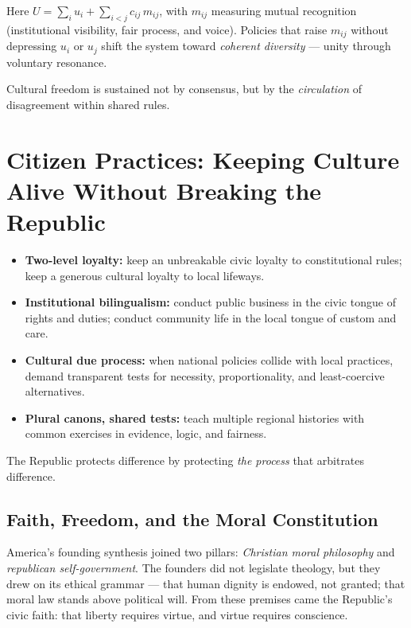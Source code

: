 \documentclass[12pt,twoside]{book}
\begin{document}
Here $U=\sum_i u_i + \sum_{i<j} c_{ij}\,m_{ij}$, with $m_{ij}$ measuring mutual recognition (institutional visibility, fair process, and voice).  
Policies that raise $m_{ij}$ without depressing $u_i$ or $u_j$ shift the system toward \emph{coherent diversity} — unity through voluntary resonance. \\

\begin{keyidea}
Cultural freedom is sustained not by consensus, but by the \emph{circulation} of disagreement within shared rules.
\end{keyidea}

\section{Citizen Practices: Keeping Culture Alive Without Breaking the Republic}

\begin{itemize}
  \item \textbf{Two-level loyalty:} keep an unbreakable civic loyalty to constitutional rules; keep a generous cultural loyalty to local lifeways.
  \item \textbf{Institutional bilingualism:} conduct public business in the civic tongue of rights and duties; conduct community life in the local tongue of custom and care.
  \item \textbf{Cultural due process:} when national policies collide with local practices, demand transparent tests for necessity, proportionality, and least-coercive alternatives.
  \item \textbf{Plural canons, shared tests:} teach multiple regional histories with common exercises in evidence, logic, and fairness.
\end{itemize}

\begin{keyidea}
The Republic protects difference by protecting \emph{the process} that arbitrates difference.
\end{keyidea}

\subsection*{Faith, Freedom, and the Moral Constitution}

America’s founding synthesis joined two pillars: \emph{Christian moral philosophy} and \emph{republican self-government}.  
The founders did not legislate theology, but they drew on its ethical grammar — that human dignity is endowed, not granted; that moral law stands above political will.  
From these premises came the Republic’s civic faith: that liberty requires virtue, and virtue requires conscience.
\end{document}
